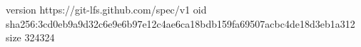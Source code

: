 version https://git-lfs.github.com/spec/v1
oid sha256:3cd0eb9a9d32c6e9e6b97e12c4ae6ca18bdb159fa69507acbc4de18d3eb1a312
size 324324
